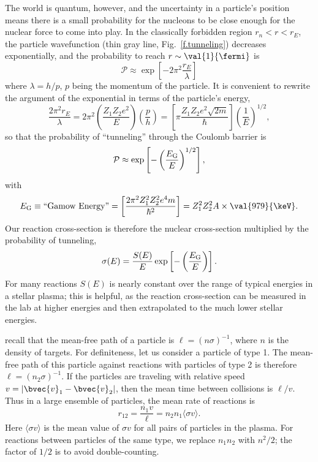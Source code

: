 The world is quantum, however, and the uncertainty in a particle's position means there is a small probability for the nucleons to be close enough for the nuclear force to come into play. In the classically forbidden region $r_{n} < r < r_{E}$, the particle wavefunction (thin gray line, Fig.~\ref{f.tunneling}) decreases exponentially, and the probability to reach $r\sim\val{1}{\fermi}$ is
\[ \mathcal{P}\approx \exp\left[-2\pi^{2}\frac{r_{E}}{\lambda}\right] \]
where $\lambda = h/p$, $p$ being the momentum of the particle.
It is convenient to rewrite the argument of the exponential in terms of the particle's energy,
\[ \frac{2\pi^{2}r_{E}}{\lambda} = 2\pi^{2}\left(\frac{Z_{1}Z_{2}e^{2}}{E}\right)
	\left(\frac{p}{h}\right) = \left[\pi \frac{Z_{1}Z_{2}e^{2}\sqrt{2m}}{\hbar}\right]\left(\frac{1}{E}\right)^{1/2}, \]
so that the probability of ``tunneling'' through the Coulomb barrier is
\begin{equation}
\mathcal{P} \approx \exp\left[-\left(\frac{E_{\mathrm{G}}}{E}\right)^{1/2}\right],
\end{equation}
with
\[ \EG \equiv \textrm{``Gamow Energy''} = \left[\frac{2\pi^{2}Z_{1}^{2}Z_{2}^{2}e^{4}m}{\hbar^{2}}\right] = Z_{1}^{2}Z_{2}^{2}A \times \val{979}{\keV}.
\]
Our reaction cross-section is therefore the nuclear cross-section multiplied by the probability of tunneling, 
\begin{equation}\label{e.s-def}
\sigma(E) = \frac{S(E)}{E}\exp\left[-\left(\frac{E_{\mathrm{G}}}{E}\right)\right].
\end{equation}
For many reactions $S(E)$ is nearly constant over the range of typical energies in a stellar plasma; this is helpful, as the reaction cross-section can be measured in the lab at higher energies and then extrapolated to the much lower stellar energies.

 recall that the mean-free path of a particle is $\ell = (n\sigma)^{-1}$, where $n$ is the density of targets. For definiteness, let us consider a particle of type 1. The mean-free path of this particle against reactions with particles of type 2 is therefore $\ell = (n_{2}\sigma)^{-1}$. If the particles are traveling with relative speed $v = |\bvec{v}_{1}-\bvec{v}_{2}|$, then the mean time between collisions is $\ell/v$. Thus in a large ensemble of particles, the mean rate of reactions is
\[
	r_{12} = \frac{n_{1} v}{\ell} = n_{2}n_{1}\langle\sigma v\rangle.
\]
Here $\langle \sigma v\rangle$ is the mean value of $\sigma v$ for all pairs of particles in the plasma.
For reactions between particles of the same type, we replace $n_{1}n_{2}$ with $n^{2}/2$; the factor of $1/2$ is to avoid double-counting.

